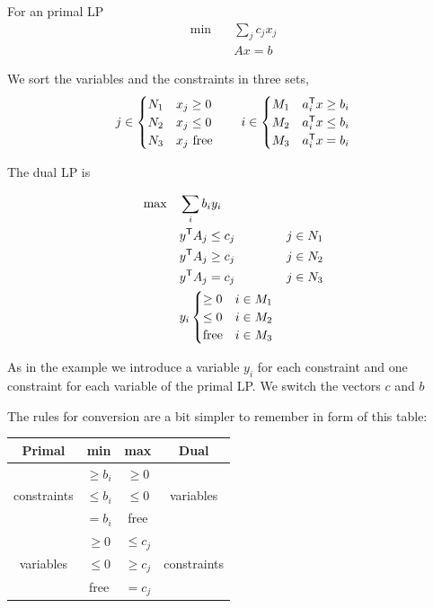 \begin{Def}[Dual]\label{Def:dual} For an primal LP
\begin{align*}
\min \quad & \sum_j c_j x_j\\
\quad & Ax =b
\end{align*}

We sort the variables and the constraints in three sets, 
\[j \in \begin{cases}
N_1 & x_j\geq 0\\
N_2 & x_j\leq 0\\
N_3 & x_j \text{ free}
\end{cases} \qquad i\in \begin{cases}
M_1 & {a}^\text{\upshape \sffamily T}_ix \geq b_i\\
M_2 & {a}^\text{\upshape \sffamily T}_ix \leq b_i\\
M_3 & {a}^\text{\upshape \sffamily T}_ix = b_i
\end{cases}\]

The dual LP is

\begin{align*}
\max \quad & \sum_i b_iy_i\\
& {y}^\text{\upshape \sffamily T} A_j \leq c_j & j\in N_1\\
& {y}^\text{\upshape \sffamily T} A_j \geq c_j & j\in N_2\\
& {y}^\text{\upshape \sffamily T} A_j = c_j & j\in N_3\\
& y_i \begin{cases}
\geq 0 & i\in M_1\\
\leq 0 & i\in M_2\\
\text{free} & i\in M_3
\end{cases}
\end{align*}

As in the example we introduce a variable $y_i$ for each constraint and one constraint for each variable of the primal LP. We switch the vectors $c$ and $b$
\end{Def}

The rules for conversion are a bit simpler to remember in form of this table:

\begin{center}
\begin{tabular}{c|c||c|c}
Primal & min & max & Dual\\\hline
\multirow{3}{*}{constraints} & $\geq b_i$ & $\geq 0$ & \multirow{3}{*}{variables}\\
& $\leq b_i$ & $\leq 0$ &\\
& $= b_i$ & free &\\\hline
\multirow{3}{*}{variables} & $\geq 0$ & $\leq c_j$ & \multirow{3}{*}{constraints}\\
& $\leq 0$ & $\geq c_j$ &\\
& free & $= c_j$ &
\end{tabular}
\end{center}

